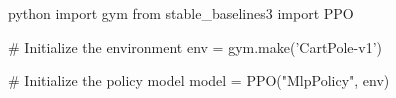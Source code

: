 python
import gym
from stable_baselines3 import PPO

# Initialize the environment
env = gym.make('CartPole-v1')

# Initialize the policy model
model = PPO("MlpPolicy", env)